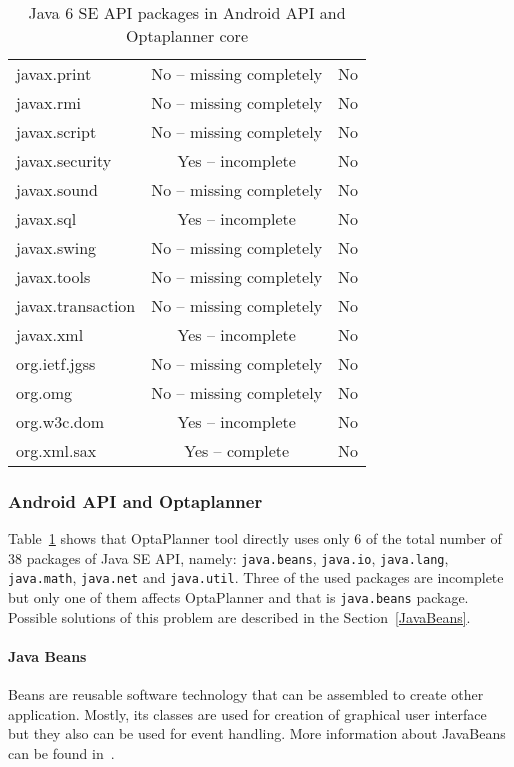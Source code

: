 \begin {table}[h!]
\begin{tabular}{|l|c|c|}
javax.print           & No -- missing completely  & No\\
javax.rmi             & No -- missing completely  & No\\
javax.script          & No -- missing completely  & No\\
javax.security        & Yes -- incomplete         & No\\
javax.sound           & No -- missing completely  & No\\
javax.sql             & Yes -- incomplete         & No\\
javax.swing           & No -- missing completely  & No\\
javax.tools           & No -- missing completely  & No\\
javax.transaction     & No -- missing completely  & No\\
javax.xml             & Yes -- incomplete         & No\\
org.ietf.jgss         & No -- missing completely  & No\\
org.omg               & No -- missing completely  & No\\
org.w3c.dom           & Yes -- incomplete         & No\\
org.xml.sax           & Yes -- complete           & No\\
\hline
\end{tabular}
\centering
\caption{Java 6 SE API packages in Android API and Optaplanner core}
\label{javaDiff}
\end{table}

\subsubsection{Android API and Optaplanner}
Table~\ref{javaDiff} shows that OptaPlanner tool directly uses only 6 of the total number of 38 packages of Java SE API, namely: \texttt{java.beans}, \texttt{java.io}, \texttt{java.lang}, \texttt{java.math}, \texttt{java.net} and \texttt{java.util}. Three of the used packages are incomplete but only one of them affects OptaPlanner and that is \texttt{java.beans} package. Possible solutions of this problem are described in the Section~\ref{JavaBeans}.
\paragraph{Java Beans}
Beans are reusable software technology that can be assembled to create other application. Mostly, its classes are used for creation of graphical user interface but they also can be used for event handling. More information about JavaBeans can be found in~\cite{Beans}.

